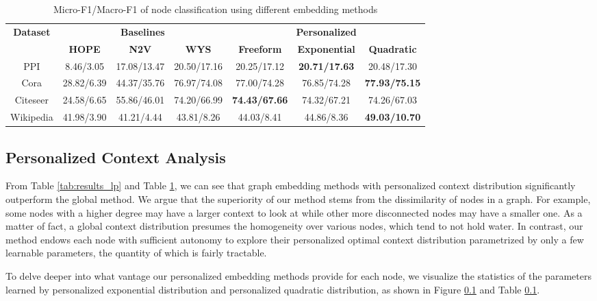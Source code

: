 \documentclass{article}
\begin{document}
\begin{table}
\caption{Micro-F1/Macro-F1 of node classification using different embedding methods}
\label{tab:results_nc}
\centering
\begin{tabular}{cccc|ccc}
\toprule
\multirow{2}{*}{\textbf{Dataset}} & \multicolumn{3}{c}{\textbf{Baselines}} & \multicolumn{3}{c}{\textbf{Personalized}} \\
 & \textbf{HOPE}  & \textbf{N2V} & \textbf{WYS} & \textbf{Freeform} & \textbf{Exponential} & \textbf{Quadratic}\\
\midrule
PPI & 8.46/3.05 & 17.08/13.47  & 20.50/17.16 & 20.25/17.12 & \textbf{20.71/17.63} & 20.48/17.30\\
Cora & 28.82/6.39 & 44.37/35.76  & 76.97/74.08 & 77.00/74.28 & 76.85/74.28 & \textbf{77.93/75.15}\\
Citeseer & 24.58/6.65  & 55.86/46.01 & 74.20/66.99 & \textbf{74.43/67.66} & 74.32/67.21 & 74.26/67.03\\
Wikipedia & 41.98/3.90  & 41.21/4.44 & 43.81/8.26 & 44.03/8.41 & 44.86/8.36 & \textbf{49.03/10.70}\\

\bottomrule
\end{tabular}
\end{table}


\subsection{Personalized Context Analysis}

From Table \ref{tab:results_lp} and Table \ref{tab:results_nc}, we can see that graph embedding methods with personalized context distribution significantly outperform the global method. We argue that the superiority of our method stems from the dissimilarity of nodes in a graph. For example, some nodes with a higher degree may have a larger context to look at while other more disconnected nodes may have a smaller one. As a matter of fact, a global context distribution presumes the homogeneity over various nodes, which tend to not hold water. In contrast, our method endows each node with sufficient autonomy to explore their personalized optimal context distribution parametrized by only a few learnable parameters, the quantity of which is fairly tractable.

To delve deeper into what vantage our personalized embedding methods provide for each node, we visualize the statistics of the parameters learned by personalized exponential distribution and personalized quadratic distribution, as shown in Figure \ref{} and Table \ref{}.
\end{document}
